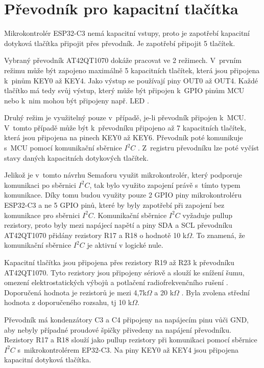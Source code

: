 
\section{Převodník pro kapacitní tlačítka}
Mikrokontrolér ESP32-C3 nemá kapacitní vstupy, proto je zapotřebí kapacitní dotyková tlačítka připojit přes převodník. Je zapotřebí připojit 
5 tlačítek. 

Vybraný převodník AT42QT1070 dokáže pracovat ve 2 režimech. V~prvním režimu může být zapojeno maximálně 5 kapacitních tlačítek, která jsou připojena
k~pinům KEY0 až KEY4. Jako výstup se používají piny OUT0 až OUT4. Každé tlačítko má tedy svůj výstup, který může být připojen k~GPIO pinům MCU 
nebo k~nim mohou být připojeny např. LED \cite{conv_cap_but_AT42QT1070_dtsh}. 

Druhý režim je využitelný pouze v~případě, je-li převodník připojen k~MCU. V~tomto případě může být k~převodníku připojeno až 7 kapacitních tlačítek, 
která jsou připojena na pinech KEY0 až KEY6. Převodník poté komunikuje s~MCU pomocí komunikační sběrnice $I^2C$ \cite{conv_cap_but_AT42QT1070_dtsh}. 
Z~registru převodníku lze poté vyčíst stavy daných kapacitních dotykových tlačítek. 

Jelikož je v~tomto návrhu Semaforu využit mikrokontrolér, který podporuje komunikaci po sběrnici $I^2C$, tak bylo využito zapojení právě s~tímto typem 
komunikace. Díky tomu budou využity pouze 2 GPIO piny mikrokontroléru ESP32-C3 a ne 5 GPIO pinů, které by byly zapotřebí při zapojení bez komunikace pro
sběrnici $I^2C$. Komunikační sběrnice $I^2C$ vyžaduje pullup rezistory, proto byly mezi napájecí napětí a piny SDA a SCL převodníku AT42QT1070 
přidány rezistory R17 a R18 o hodnotě 10 k$\Omega$. To znamená, že komunikační sběrnice $I^2C$ je aktivní v logické nule. 

Kapacitní tlačítka jsou připojena přes rezistory R19 až R23 k převodníku AT42QT1070. Tyto rezistory jsou připojeny sériově a slouží ke snížení šumu, 
omezení elektrostatických výbojů a potlačení radiofrekvenčního rušení \cite{conv_cap_but_AT42QT1070_dtsh}. Doporučená hodnota je rezistorů je mezi 
4,7k$\Omega$ a 20 k$\Omega$ \cite{conv_cap_but_AT42QT1070_dtsh}. Byla zvolena střední hodnota z doporučeného rozsahu, tj 10 k$\Omega$.

Převodník má kondenzátory C3 a C4 připojeny na napájecím pinu vůči GND, aby nebyly případné proudové špičky přivedeny na napájení převodníku. Rezistory
R17 a R18 slouží jako pullup rezistory při komunikaci pomocí sběrnice $I^2C$ s~mikrokontrolérem EP32-C3. Na piny KEY0 až KEY4 jsou připojena kapacitní 
dotyková tlačítka.  

